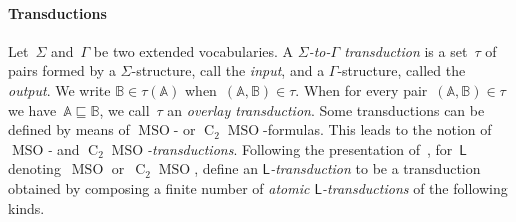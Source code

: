 \documentclass{lmcs} %
\newcommand*\defd[2][\em\color{red!25!black}]{{#1#2}}
\newcommand{\MSO}{\ensuremath{\operatorname{MSO}}\xspace}
\newcommand{\CMSO}[1][]{\ensuremath{\C[#1]{\!\!}\MSO}\xspace}
\newcommand{\C}[1][]{\ensuremath{\operatorname{C}_{#1}}\xspace}
\begin{document}
\paragraph*{Transductions}
Let~$\Sigma$ and~$\Gamma$ be two extended vocabularies.
A \defd{$\Sigma$-to-$\Gamma$ transduction}
is a set~$\tau$ of pairs formed by
a $\Sigma$-structure, call the \defd{input},
and a $\Gamma$-structure, called the \defd{output}.
We write \defd{$\mathbb{B}\in\tau(\mathbb{A})$} when~$(\mathbb{A},\mathbb{B})\in\tau$.
When for every pair~$(\mathbb{A},\mathbb{B})\in\tau$
we have~$\mathbb{A}\sqsubseteq\mathbb{B}$,
we call~$\tau$ an
\defd{overlay transduction}.
Some transductions
can be defined by means of \MSO- or \CMSO[2]-formulas.
This leads to the notion of \defd{\MSO-} and \defd{\CMSO[2]-transductions}.
Following the presentation of~\cite{BojanczykGP21},
for~$\mathsf{L}$ denoting~\MSO or~\CMSO[2],
define an \defd{$\mathsf{L}$-transduction}
to be a transduction obtained
by composing a finite number of \defd{atomic $\mathsf{L}$-transductions}
of the following kinds.
\end{document}
